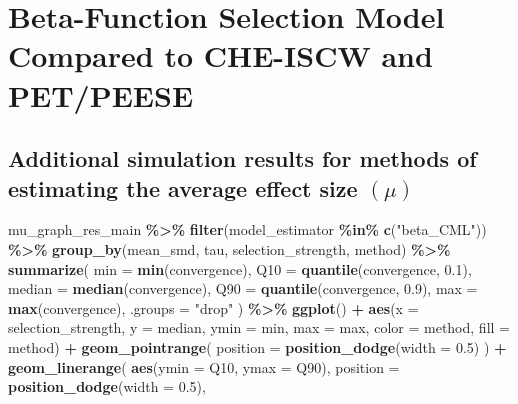 \documentclass[
]{article}
\newenvironment{Shaded}{\begin{snugshade}}{\end{snugshade}}
\newcommand{\AttributeTok}[1]{\textcolor[rgb]{0.13,0.29,0.53}{#1}}
\newcommand{\FloatTok}[1]{\textcolor[rgb]{0.00,0.00,0.81}{#1}}
\newcommand{\FunctionTok}[1]{\textcolor[rgb]{0.13,0.29,0.53}{\textbf{#1}}}
\newcommand{\NormalTok}[1]{#1}
\newcommand{\SpecialCharTok}[1]{\textcolor[rgb]{0.81,0.36,0.00}{\textbf{#1}}}
\newcommand{\StringTok}[1]{\textcolor[rgb]{0.31,0.60,0.02}{#1}}
\begin{document}
\section{Beta-Function Selection Model Compared to CHE-ISCW and
PET/PEESE}\label{beta-function-selection-model-compared-to-che-iscw-and-petpeese}

\subsection{\texorpdfstring{Additional simulation results for methods of
estimating the average effect size
\((\mu)\)}{Additional simulation results for methods of estimating the average effect size (\textbackslash mu)}}\label{mu-simulation-results-main}

\begin{Shaded}
\begin{Highlighting}[]
\NormalTok{mu\_graph\_res\_main }\SpecialCharTok{\%\textgreater{}\%}
  \FunctionTok{filter}\NormalTok{(model\_estimator }\SpecialCharTok{\%in\%} \FunctionTok{c}\NormalTok{(}\StringTok{"beta\_CML"}\NormalTok{)) }\SpecialCharTok{\%\textgreater{}\%}
  \FunctionTok{group\_by}\NormalTok{(mean\_smd, tau, selection\_strength, method) }\SpecialCharTok{\%\textgreater{}\%}
  \FunctionTok{summarize}\NormalTok{(}
    \AttributeTok{min =} \FunctionTok{min}\NormalTok{(convergence),}
    \AttributeTok{Q10 =} \FunctionTok{quantile}\NormalTok{(convergence, }\FloatTok{0.1}\NormalTok{),}
    \AttributeTok{median =} \FunctionTok{median}\NormalTok{(convergence),}
    \AttributeTok{Q90 =} \FunctionTok{quantile}\NormalTok{(convergence, }\FloatTok{0.9}\NormalTok{),}
    \AttributeTok{max =} \FunctionTok{max}\NormalTok{(convergence),}
    \AttributeTok{.groups =} \StringTok{"drop"}
\NormalTok{  ) }\SpecialCharTok{\%\textgreater{}\%}
\FunctionTok{ggplot}\NormalTok{() }\SpecialCharTok{+} 
  \FunctionTok{aes}\NormalTok{(}\AttributeTok{x =}\NormalTok{ selection\_strength, }\AttributeTok{y =}\NormalTok{ median, }\AttributeTok{ymin =}\NormalTok{ min, }\AttributeTok{max =}\NormalTok{ max, }\AttributeTok{color =}\NormalTok{ method, }\AttributeTok{fill =}\NormalTok{ method) }\SpecialCharTok{+}
  \FunctionTok{geom\_pointrange}\NormalTok{(}
    \AttributeTok{position =} \FunctionTok{position\_dodge}\NormalTok{(}\AttributeTok{width =} \FloatTok{0.5}\NormalTok{)}
\NormalTok{  ) }\SpecialCharTok{+} 
  \FunctionTok{geom\_linerange}\NormalTok{(}
    \FunctionTok{aes}\NormalTok{(}\AttributeTok{ymin =}\NormalTok{ Q10, }\AttributeTok{ymax =}\NormalTok{ Q90),}
    \AttributeTok{position =} \FunctionTok{position\_dodge}\NormalTok{(}\AttributeTok{width =} \FloatTok{0.5}\NormalTok{),}

\end{Highlighting}
\end{Shaded}
\end{document}
